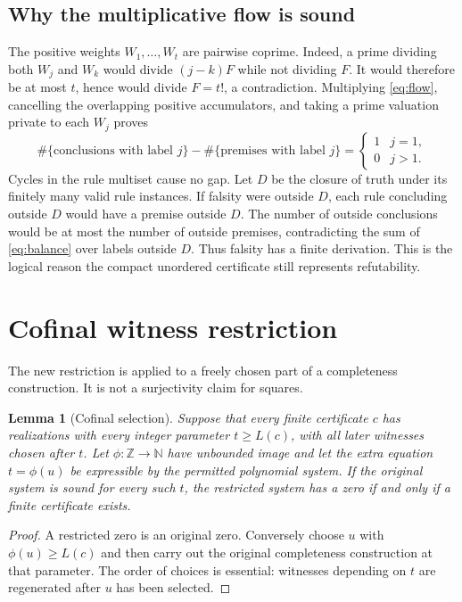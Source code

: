 \documentclass[11pt]{article}
\newcommand{\Z}{\mathbb Z}\newcommand{\N}{\mathbb N}
\newtheorem{lemma}[theorem]{Lemma}
\theoremstyle{definition}\newtheorem{definition}[theorem]{Definition}
\theoremstyle{remark}\newtheorem{remark}[theorem]{Remark}
\begin{document}
\subsection{Why the multiplicative flow is sound}
The positive weights $W_1,\ldots,W_t$ are pairwise coprime. Indeed, a prime
dividing both $W_j$ and $W_k$ would divide $(j-k)F$ while not dividing $F$.
It would therefore be at most $t$, hence would divide $F=t!$, a contradiction.
Multiplying \eqref{eq:flow}, cancelling the overlapping positive accumulators,
and taking a prime valuation private to each $W_j$ proves
\[
 \#\{\text{conclusions with label }j\}
 -\#\{\text{premises with label }j\}
 =\begin{cases}1&j=1,\\0&j>1.\end{cases}
 \tag{5}\label{eq:balance}
\]
Cycles in the rule multiset cause no gap. Let $D$ be the closure of truth
under its finitely many valid rule instances. If falsity were outside $D$,
each rule concluding outside $D$ would have a premise outside $D$.
The number of outside conclusions would be at most the number of outside
premises, contradicting the sum of \eqref{eq:balance} over labels outside $D$.
Thus falsity has a finite derivation. This is the logical reason the compact
unordered certificate still represents refutability.

\section{Cofinal witness restriction}
\label{sec:cofinal}

The new restriction is applied to a freely chosen part of a completeness
construction. It is not a surjectivity claim for squares.

\begin{lemma}[Cofinal selection]
Suppose that every finite certificate $c$ has realizations with every integer
parameter $t\ge L(c)$, with all later witnesses chosen after $t$. Let
$\phi:\Z\to\N$ have unbounded image and let the extra equation
$t=\phi(u)$ be expressible by the permitted polynomial system. If the
original system is sound for every such $t$, the restricted system has a
zero if and only if a finite certificate exists.
\end{lemma}
\begin{proof}
A restricted zero is an original zero. Conversely choose $u$ with
$\phi(u)\ge L(c)$ and then carry out the original completeness construction
at that parameter. The order of choices is essential: witnesses depending on
$t$ are regenerated after $u$ has been selected.
\end{proof}
\end{document}

